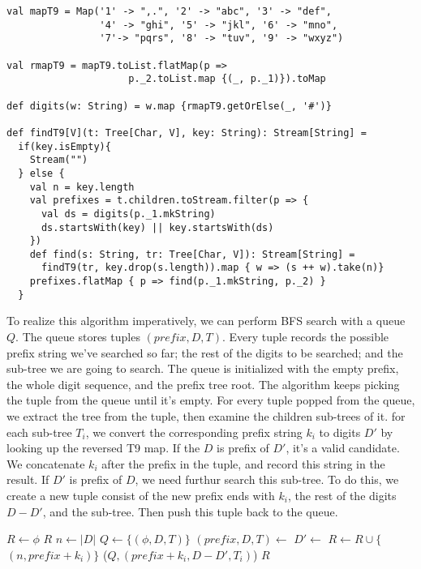 \documentclass{article}
\begin{document}
\lstset{language=Scala}
\begin{lstlisting}
val mapT9 = Map('1' -> ",.", '2' -> "abc", '3' -> "def",
                '4' -> "ghi", '5' -> "jkl", '6' -> "mno",
                '7'-> "pqrs", '8' -> "tuv", '9' -> "wxyz")

val rmapT9 = mapT9.toList.flatMap(p =>
                     p._2.toList.map {(_, p._1)}).toMap

def digits(w: String) = w.map {rmapT9.getOrElse(_, '#')}

def findT9[V](t: Tree[Char, V], key: String): Stream[String] =
  if(key.isEmpty){
    Stream("")
  } else {
    val n = key.length
    val prefixes = t.children.toStream.filter(p => {
      val ds = digits(p._1.mkString)
      ds.startsWith(key) || key.startsWith(ds)
    })
    def find(s: String, tr: Tree[Char, V]): Stream[String] =
      findT9(tr, key.drop(s.length)).map { w => (s ++ w).take(n)}
    prefixes.flatMap { p => find(p._1.mkString, p._2) }
  }
\end{lstlisting}

To realize this algorithm imperatively, we can perform BFS search with a queue $Q$.
The queue stores tuples $(prefix, D, T)$. Every tuple records the possible
prefix string we've searched so far; the rest of the digits to be searched;
and the sub-tree we are going to search. The queue is initialized with the
empty prefix, the whole digit sequence, and the prefix tree root. The algorithm
keeps picking the tuple from the queue until it's empty. For every tuple
popped from the queue, we extract the tree from the tuple, then examine the
children sub-trees of it. for each sub-tree $T_i$, we convert the corresponding
prefix string $k_i$ to digits $D'$ by looking up the reversed T9 map. If the
$D$ is prefix of $D'$, it's a valid candidate. We concatenate $k_i$ after
the prefix in the tuple, and record this string in the result. If $D'$ is
prefix of $D$, we need furthur search this sub-tree. To do this, we
create a new tuple consist of the new prefix ends with $k_i$, the rest of
the digits $D-D'$, and the sub-tree. Then push this tuple back to the queue.

\begin{algorithmic}[1]
  \State $R \gets \phi$
    \State \Return $R$
  \EndIf
  \State $n \gets |D|$
  \State $Q \gets \{(\phi, D, T)\}$
    \State $(prefix, D, T) \gets$ 
      \State $D' \gets$ 
       
        \State $R \gets R \cup \{$  $(n, prefix + k_i) \}$ 
        \State {}($Q, (prefix + k_i, D - D', T_i)$)
      \EndIf
    \EndFor
  \EndWhile
  \State \Return $R$
\EndFunction
\end{algorithmic}
\end{document}

